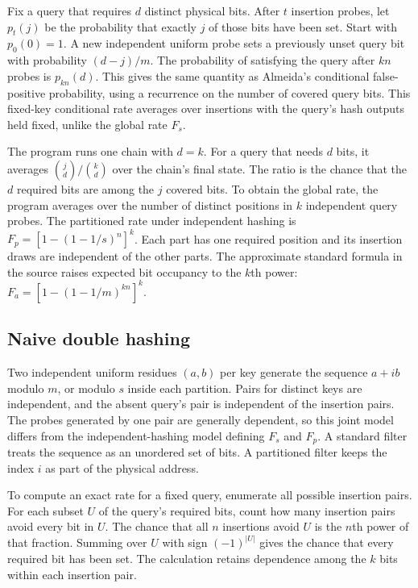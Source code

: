 Fix a query that requires $d$ distinct physical bits. After $t$ insertion
probes, let $p_t(j)$ be the probability that exactly $j$ of those bits
have been set. Start with $p_0(0)=1$. A new independent uniform probe
sets a previously unset query bit with probability $(d-j)/m$.
The probability of satisfying the query after $kn$ probes is
$p_{kn}(d)$. This gives the same quantity as Almeida's conditional
false-positive probability, using a recurrence on the number of covered
query bits. This fixed-key conditional rate averages over insertions
with the query's hash outputs held fixed, unlike the global rate $F_s$.

The program runs one chain with $d=k$. For a query that needs $d$ bits,
it averages $\binom{j}{d}/\binom{k}{d}$ over the chain's final state.
The ratio is the chance that the $d$ required bits are among the $j$
covered bits. To obtain the global rate, the program averages over
the number of distinct positions in $k$ independent query probes. The partitioned
rate under independent hashing is
$F_p=[1-(1-1/s)^n]^k$. Each part has one required position and its insertion
draws are independent of the other parts. The approximate standard
formula in the source raises expected bit occupancy to the $k$th power:
$F_a=[1-(1-1/m)^{kn}]^k$.

\subsection{Naive double hashing}

Two independent uniform residues $(a,b)$ per key generate the sequence
$a+ib$ modulo $m$, or modulo $s$ inside each partition. Pairs for distinct
keys are independent, and the absent query's pair is independent of the
insertion pairs. The probes generated by one pair are generally dependent,
so this joint model differs from the independent-hashing model defining
$F_s$ and $F_p$. A standard filter treats the sequence as an unordered
set of bits. A partitioned filter keeps the index $i$ as part of the
physical address.

To compute an exact rate for a fixed query, enumerate all possible
insertion pairs. For each subset $U$ of the query's required bits, count
how many insertion pairs avoid every bit in $U$. The chance that all
$n$ insertions avoid $U$ is the $n$th power of that fraction. Summing over
$U$ with sign $(-1)^{|U|}$ gives the chance that every required bit has
been set. The calculation retains dependence among the $k$ bits
within each insertion pair.


